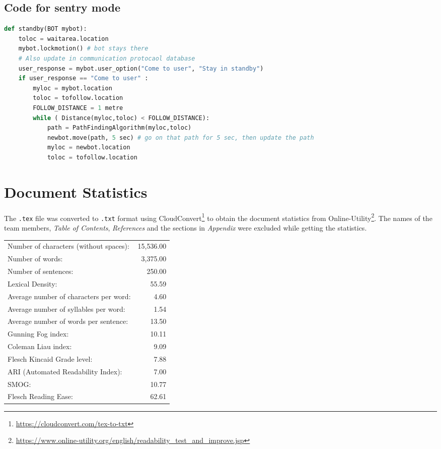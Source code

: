\documentclass{article}
\begin{document}
\subsection{Code for sentry mode}
\label{code:m}
\begin{lstlisting}[language=Python, caption=Conserving battery/Sentry mode]
def standby(BOT mybot):
    toloc = waitarea.location
    mybot.lockmotion() # bot stays there
    # Also update in communication protocaol database
    user_response = mybot.user_option("Come to user", "Stay in standby")
    if user_response == "Come to user" :
    	myloc = mybot.location
    	toloc = tofollow.location
    	FOLLOW_DISTANCE = 1 metre
    	while ( Distance(myloc,toloc) < FOLLOW_DISTANCE):
            path = PathFindingAlgorithm(myloc,toloc)
            newbot.move(path, 5 sec) # go on that path for 5 sec, then update the path
            myloc = newbot.location
            toloc = tofollow.location
\end{lstlisting}



\section{Document Statistics}
The \texttt{.tex} file was converted to \texttt{.txt} format using CloudConvert\footnote{\url{https://cloudconvert.com/tex-to-txt}} to obtain the document statistics from Online-Utility\footnote{\url{https://www.online-utility.org/english/readability_test_and_improve.jsp}}. The names of the team members, \textit{Table of Contents}, \textit{References} and the sections in \textit{Appendix} were excluded while getting the statistics. \\ 

\noindent \begin{tabular*}{\textwidth}{ || l@{\extracolsep{\fill}} r ||}
    \hline \hline

    Number of characters (without spaces): &	15,536.00 \\
    Number of words: &	3,375.00 \\
    Number of sentences: &	250.00 \\
    Lexical Density: &	55.59 \\
    Average number of characters per word: &	4.60 \\
    Average number of syllables per word: &	1.54 \\
    Average number of words per sentence: &	13.50 \\
    
    \hline
    Gunning Fog index: &	10.11 \\
    
    \hline
    Coleman Liau index: &	9.09 \\
    Flesch Kincaid Grade level: &	7.88 \\
    ARI (Automated Readability Index): &	7.00 \\
    SMOG: &	10.77 \\
    
    \hline
    Flesch Reading Ease: &	62.61 \\

    \hline \hline
\end{tabular*}
\end{document}
